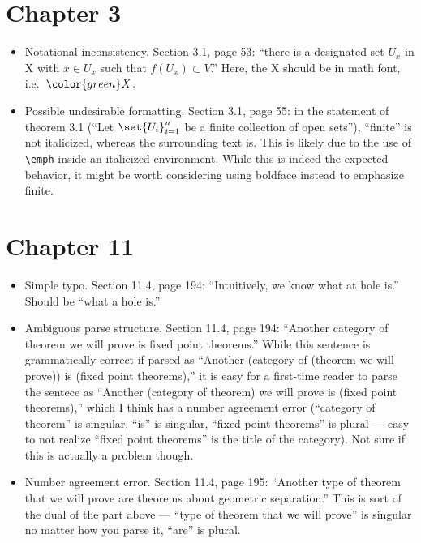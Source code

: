 \documentclass{fkletter}
\begin{document}
\section*{Chapter 3}
\begin{itemize}
  \item Notational inconsistency. Section 3.1, page 53: ``there is a designated
    set $U_x$ in {\color{red} X} with $x \in U_x$ such that $f(U_x) \subset
    V$.'' Here, the {\color{red} X} should be in math font, i.e.\
    ${\color{green} X}$.
  \item Possible undesirable formatting. Section 3.1, page 55: in the statement
    of theorem 3.1 (``Let $\set{U_i}_{i=1}^n$ be a finite collection of open
    sets''), ``finite'' is not italicized, whereas the surrounding text is. This
    is likely due to the use of \verb|\emph| inside an italicized environment.
    While this is indeed the expected behavior, it might be worth considering
    using boldface instead to emphasize finite.
\end{itemize}
\section*{Chapter 11}
\begin{itemize}
  \item Simple typo. Section 11.4, page 194: ``Intuitively, we know what
    {\color{red} at} hole is.'' Should be ``what {\color{green} a} hole is.''
  \item Ambiguous parse structure. Section 11.4, page 194: ``Another category of
    theorem we will prove is fixed point theorems.'' While this sentence is
    grammatically correct if parsed as ``Another (category of (theorem we will
    prove)) is (fixed point theorems),'' it is easy for a first-time reader to
    parse the sentece as ``Another (category of theorem) we will prove is (fixed
    point theorems),'' which I think has a number agreement error (``category of
    theorem'' is singular, ``is'' is singular, ``fixed point theorems'' is
    plural --- easy to not realize ``fixed point theorems'' is the title of the
    category). Not sure if this is actually a problem though.
  \item Number agreement error. Section 11.4, page 195: ``Another type of
    theorem that we will prove {\color{red} are} theorems about geometric
    separation.'' This is sort of the dual of the part above --- ``type of
    theorem that we will prove'' is singular no matter how you parse it, ``are''
    is plural.
\end{itemize}
\end{document}
